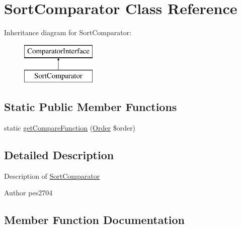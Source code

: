 \hypertarget{class_pes_1_1_comparator_1_1_sort_comparator}{}\section{Sort\+Comparator Class Reference}
\label{class_pes_1_1_comparator_1_1_sort_comparator}
Inheritance diagram for Sort\+Comparator\+:\begin{figure}[H]
\begin{center}
\leavevmode
\includegraphics[height=2.000000cm]{class_pes_1_1_comparator_1_1_sort_comparator}
\end{center}
\end{figure}
\subsection*{Static Public Member Functions}
\begin{DoxyCompactItemize}
\item 
static \mbox{\hyperlink{class_pes_1_1_comparator_1_1_sort_comparator_a21aeb75d37fce6724b5a60f836dfc85c}{get\+Compare\+Function}} (\mbox{\hyperlink{class_pes_1_1_query_1_1_order}{Order}} \$order)
\end{DoxyCompactItemize}


\subsection{Detailed Description}
Description of \mbox{\hyperlink{class_pes_1_1_comparator_1_1_sort_comparator}{Sort\+Comparator}}

\begin{DoxyAuthor}{Author}
pes2704 
\end{DoxyAuthor}


\subsection{Member Function Documentation}
\mbox{\label{class_pes_1_1_comparator_1_1_sort_comparator_a21aeb75d37fce6724b5a60f836dfc85c}} 
